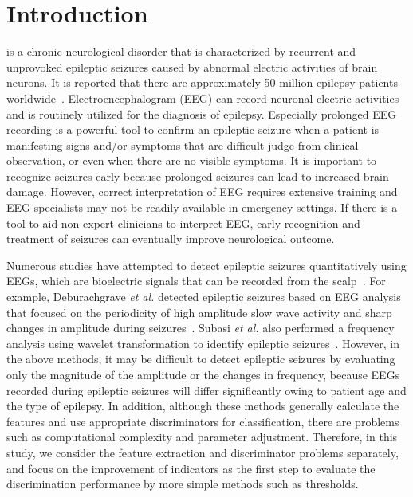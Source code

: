\documentclass[journal]{IEEEtran}
\begin{document}
\section{Introduction}
%
%
%
%
 is a chronic neurological disorder that is characterized by recurrent and unprovoked epileptic seizures caused by abnormal electric activities of brain neurons. It is reported that there are approximately 50 million epilepsy patients worldwide~\cite{WHO}.
Electroencephalogram (EEG) can record neuronal electric activities and is routinely utilized for the diagnosis of epilepsy. Especially prolonged EEG recording is a powerful tool to confirm an epileptic seizure when a patient is manifesting signs and/or symptoms that are difficult judge from clinical observation, or even when there are no visible symptoms.
It is important to recognize seizures early because prolonged seizures can lead to increased brain damage.
However, correct interpretation of EEG requires extensive training and EEG specialists may not be readily available in emergency settings. If there is a tool to aid non-expert clinicians to interpret EEG, early recognition and treatment of seizures can eventually improve neurological outcome.

Numerous studies have attempted to detect epileptic seizures quantitatively using EEGs, which are bioelectric signals that can be recorded from the scalp~\cite{Deburchgraeve2008,Subasi2005,kellaway1979precise,Panzica1999,fusco1993ictal,Acir2005,Greene2008}.
For example, Deburachgrave \textit{et al.} detected epileptic seizures based on EEG analysis that focused on the periodicity of high amplitude slow wave activity and sharp changes in amplitude during seizures~\cite{Deburchgraeve2008}.
Subasi \textit{et al.} also performed a frequency analysis using wavelet transformation to identify epileptic seizures~\cite{Subasi2005}.
However, in the above methods, it may be difficult to detect epileptic seizures by evaluating only the magnitude of the amplitude or the changes in frequency, because EEGs recorded during epileptic seizures will differ significantly owing to patient age and the type of epilepsy.
In addition, although these methods generally calculate the features and use appropriate discriminators for classification,
there are problems such as computational complexity and parameter adjustment.
Therefore, in this study, we consider the feature extraction and discriminator problems separately, and focus on the improvement of indicators as the first step to evaluate the discrimination performance by more simple methods such as thresholds.
\end{document}
